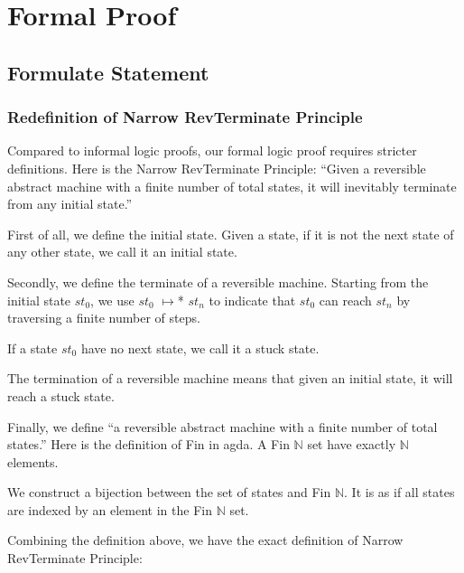\chapter{Formal Proof}
\label{chapter:ref}

\section{Formulate Statement}

\subsection{ Redefinition of Narrow RevTerminate Principle}
Compared to informal logic proofs, our formal logic proof requires stricter definitions. 
Here is the Narrow RevTerminate Principle:
``Given a reversible abstract machine with a finite number of total states, it will inevitably terminate from any initial state.''

First of all, we define the initial state.  Given a state, if it is not the next state of any other state, we call it an initial state.



Secondly, we define the terminate of a reversible machine.
Starting from the initial state $st_{0}$, we use $st_{0}$ $\mapsto$* $st_{n}$ to indicate that $st_{0}$ can reach $st_{n}$ by traversing a finite number of steps.



If a state $st_{0}$ have no next state, we call it a stuck state.



The termination of a reversible machine means that given an initial state, it will reach a stuck state.



Finally, we define ``a reversible abstract machine with a finite number of total states.''
Here is the definition of Fin in agda.  A Fin $\mathbb{N}$ set have exactly $\mathbb{N}$ elements.



We construct a bijection between the set of states and Fin $\mathbb{N}$.
It is as if all states are indexed by an element in the Fin $\mathbb{N}$ set.



Combining the definition above, we have the exact definition of Narrow RevTerminate Principle:



